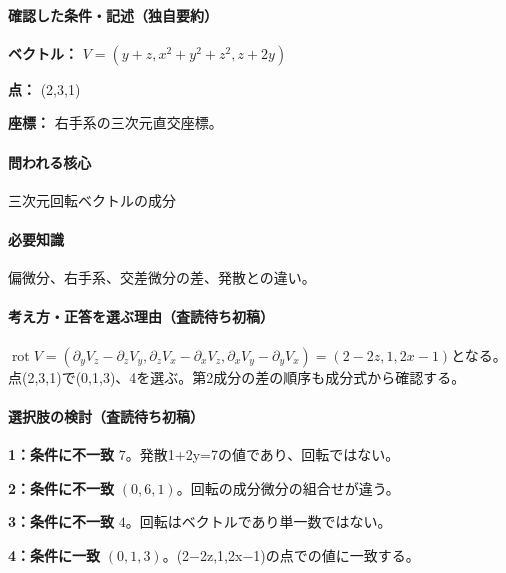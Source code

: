 \paragraph{確認した条件・記述（独自要約）}\mbox{}\par

\noindent\textbf{ベクトル：} \(V=(y+z,x^2+y^2+z^2,z+2y)\)\par

\noindent\textbf{点：} (2,3,1)\par

\noindent\textbf{座標：} 右手系の三次元直交座標。\par

\paragraph{問われる核心} 三次元回転ベクトルの成分

\paragraph{必要知識} 偏微分、右手系、交差微分の差、発散との違い。

\paragraph{考え方・正答を選ぶ理由（査読待ち初稿）} \(\operatorname{rot}V=(\partial_yV_z-\partial_zV_y,\partial_zV_x-\partial_xV_z,\partial_xV_y-\partial_yV_x)=(2-2z,1,2x-1)\)となる。点(2,3,1)で(0,1,3)、4を選ぶ。第2成分の差の順序も成分式から確認する。

\paragraph{選択肢の検討（査読待ち初稿）}\mbox{}\par

\noindent\textbf{1：条件に不一致} \(7\)。発散1+2y=\allowbreak{}7の値であり、回転ではない。\par

\noindent\textbf{2：条件に不一致} \((0,6,1)\)。回転の成分微分の組合せが違う。\par

\noindent\textbf{3：条件に不一致} \(4\)。回転はベクトルであり単一数ではない。\par

\noindent\textbf{4：条件に一致} \((0,1,3)\)。(2−2z,1,2x−1)の点での値に一致する。\par

